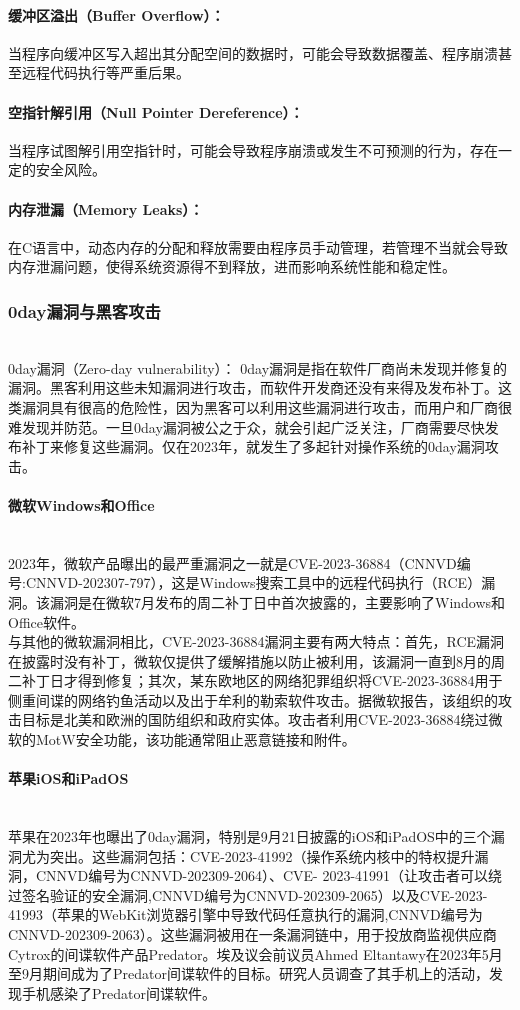 \documentclass{ctexart}
\begin{document}
\paragraph{缓冲区溢出（Buffer Overflow）：}
 当程序向缓冲区写入超出其分配空间的数据时，可能会导致数据覆盖、程序崩溃甚至远程代码执行等严重后果。
\paragraph{空指针解引用（Null Pointer Dereference）：}
 当程序试图解引用空指针时，可能会导致程序崩溃或发生不可预测的行为，存在一定的安全风险。
\paragraph{内存泄漏（Memory Leaks）：}
 在C语言中，动态内存的分配和释放需要由程序员手动管理，若管理不当就会导致内存泄漏问题，使得系统资源得不到释放，进而影响系统性能和稳定性。
\subsubsection{0day漏洞与黑客攻击}\ \\
 \indent 0day漏洞（Zero-day vulnerability）： 0day漏洞是指在软件厂商尚未发现并修复的漏洞。黑客利用这些未知漏洞进行攻击，而软件开发商还没有来得及发布补丁。这类漏洞具有很高的危险性，因为黑客可以利用这些漏洞进行攻击，而用户和厂商很难发现并防范。一旦0day漏洞被公之于众，就会引起广泛关注，厂商需要尽快发布补丁来修复这些漏洞。仅在2023年，就发生了多起针对操作系统的0day漏洞攻击。
\paragraph{微软Windows和Office}\ \\
 \indent 2023年，微软产品曝出的最严重漏洞之一就是CVE-2023-36884（CNNVD编号:CNNVD-202307-797），这是Windows搜索工具中的远程代码执行（RCE）漏洞。该漏洞是在微软7月发布的周二补丁日中首次披露的，主要影响了Windows和Office软件。\\
\indent 与其他的微软漏洞相比，CVE-2023-36884漏洞主要有两大特点：首先，RCE漏洞在披露时没有补丁，微软仅提供了缓解措施以防止被利用，该漏洞一直到8月的周二补丁日才得到修复；其次，某东欧地区的网络犯罪组织将CVE-2023-36884用于侧重间谍的网络钓鱼活动以及出于牟利的勒索软件攻击。据微软报告，该组织的攻击目标是北美和欧洲的国防组织和政府实体。攻击者利用CVE-2023-36884绕过微软的MotW安全功能，该功能通常阻止恶意链接和附件。
\paragraph{苹果iOS和iPadOS}\ \\
\indent 苹果在2023年也曝出了0day漏洞，特别是9月21日披露的iOS和iPadOS中的三个漏洞尤为突出。这些漏洞包括：CVE-2023-41992（操作系统内核中的特权提升漏洞，CNNVD编号为CNNVD-202309-2064）、CVE- 2023-41991（让攻击者可以绕过签名验证的安全漏洞,CNNVD编号为CNNVD-202309-2065）以及CVE-2023-41993（苹果的WebKit浏览器引擎中导致代码任意执行的漏洞,CNNVD编号为CNNVD-202309-2063）。这些漏洞被用在一条漏洞链中，用于投放商监视供应商Cytrox的间谍软件产品Predator。埃及议会前议员Ahmed Eltantawy在2023年5月至9月期间成为了Predator间谍软件的目标。研究人员调查了其手机上的活动，发现手机感染了Predator间谍软件。
\end{document}
